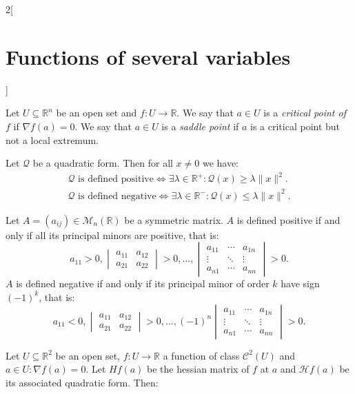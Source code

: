 \documentclass[class=article,10pt,crop=false]{standalone}
\begin{document}
\begin{multicols}{2}[\section{Functions of several variables}]
\begin{definition}
Let $U\subseteq\mathbb{R}^n$ be an open set and $f:U\rightarrow\mathbb{R}$. We say that $a\in U$ is a \textit{critical point of $f$} if $\nabla f(a)=0$. We say that $a\in U$ is a \textit{saddle point} if $a$ is a critical point but not a local extremum.
\end{definition}
\begin{theorem}
Let $\mathcal{Q}$ be a quadratic form. Then for all $x\ne 0$ we have:
\begin{gather*}
    \mathcal{Q}\text{ is defined positive}\iff\exists\lambda\in\mathbb{R}^+:\mathcal{Q}(x)\geq\lambda\|x\|^2.\\
    \mathcal{Q}\text{ is defined negative}\iff\exists\lambda\in\mathbb{R}^-:\mathcal{Q}(x)\leq\lambda\|x\|^2.
\end{gather*}
\end{theorem}
\begin{prop}
Let $A=(a_{ij})\in\mathcal{M}_n(\mathbb{R})$ be a symmetric matrix. $A$ is defined positive if and only if all its principal minors are positive, that is: $$a_{11}>0,\begin{vmatrix}
a_{11} & a_{12}\\
a_{21} & a_{22} \end{vmatrix}>0,\ldots,
\begin{vmatrix}
a_{11} &\cdots & a_{1n}\\
\vdots & \ddots & \vdots \\
a_{n1} & \cdots & a_{nn}
\end{vmatrix}>0.$$ $A$ is defined negative if and only if its principal minor of order $k$ have sign $(-1)^k$, that is: $$a_{11}<0,
\begin{vmatrix}
a_{11} & a_{12}\\
a_{21} & a_{22}
\end{vmatrix}>0,\ldots,
(-1)^n\begin{vmatrix}
a_{11} &\cdots & a_{1n}\\
\vdots & \ddots & \vdots \\
a_{n1} & \cdots & a_{nn}
\end{vmatrix}>0.$$
\end{prop}
\begin{theorem}
Let $U\subseteq\mathbb{R}^2$ be an open set, $f:U\rightarrow\mathbb{R}$ a function of class $\mathcal{C}^2(U)$ and $a\in U:\nabla f(a)=0$. Let $Hf(a)$ be the hessian matrix of $f$ at $a$ and $\mathcal{H}f(a)$ be its associated quadratic form. Then:
\begin{enumerate}

\end{enumerate}
\end{theorem}
\end{multicols}
\end{document}
